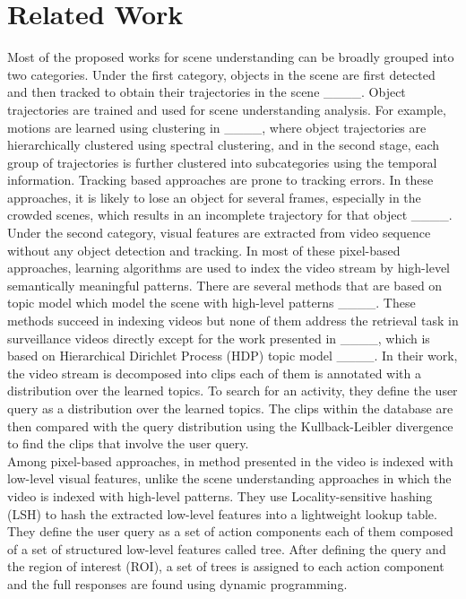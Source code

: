 \section{Related Work}
\label{subsec:relatedWorks}
\indent Most of the proposed works for scene understanding can be broadly grouped into two categories. Under the first category, objects in the scene are first detected and then tracked to obtain their trajectories in the scene  ____. Object trajectories are trained and used for scene understanding analysis. For example, motions are learned using clustering in ____, where object trajectories are hierarchically clustered using spectral clustering, and in the second stage, each group of trajectories is further clustered into subcategories using the temporal information. Tracking based approaches are prone to tracking errors. In these approaches, it is likely to lose an object for several frames, especially in the crowded scenes, which results in an incomplete trajectory for that object ____.\\ 
%
\indent Under the second category, visual features are extracted from video sequence without any object detection and tracking. In most of these pixel-based approaches, learning algorithms are used to index the video stream by high-level semantically meaningful patterns. There are several methods that are based on topic model which model the scene with high-level patterns ____. These methods succeed in indexing videos but none of them address the retrieval task in surveillance videos directly except for the work presented in ____, which is based on Hierarchical Dirichlet Process (HDP) topic model ____. In their work, the video stream is decomposed into clips each of them is annotated with a distribution over the learned topics. To search for an activity, they define the user query as a distribution over the learned topics. The clips within the database are then compared with the query distribution using the Kullback-Leibler divergence to find the clips that involve the user query. \\
%
\indent  Among pixel-based approaches, in method presented in the video is indexed with low-level visual features, unlike the scene understanding approaches in which the video is indexed with high-level patterns. They use Locality-sensitive hashing (LSH) to hash the extracted low-level features into a lightweight lookup table. They define the user query as a set of action components each of them composed of a set of structured low-level features called tree. After defining the query and the region of interest (ROI), a set of trees is assigned to each action component and the full responses are found using dynamic programming. 
